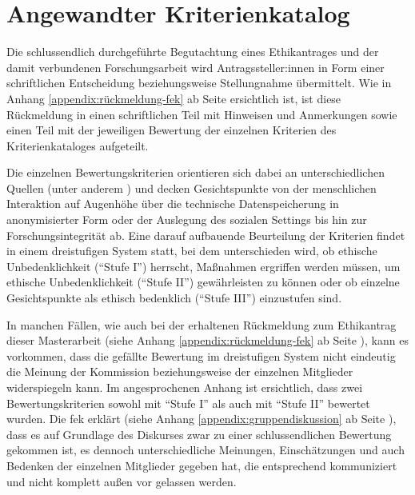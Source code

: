 \documentclass[a4paper,12pt,twoside]{scrreprt}
\begin{document}
\section{Angewandter Kriterienkatalog}
\label{sec:angewandter-kriterienkatalog}

Die schlussendlich durchgeführte Begutachtung eines Ethikantrages und der damit verbundenen Forschungsarbeit wird Antragssteller:innen in Form einer schriftlichen Entscheidung beziehungsweise Stellungnahme übermittelt. \cite[4]{forschungsethik-kommission_der_fachhochschule_vorarlberg_verfahrensordnung_2020} Wie in Anhang \ref{appendix:rückmeldung-fek} ab Seite \pageref{appendix:rückmeldung-fek} ersichtlich ist, ist diese Rückmeldung in einen schriftlichen Teil mit Hinweisen und Anmerkungen sowie einen Teil mit der jeweiligen Bewertung der einzelnen Kriterien des Kriterienkataloges aufgeteilt.

Die einzelnen Bewertungskriterien orientieren sich dabei an unterschiedlichen Quellen (unter anderem \cite{manzeschke_meestar_2015, marckmann_was_2000, schuchter_care_2018}) und decken Gesichtspunkte von der menschlichen Interaktion auf Augenhöhe über die technische Datenspeicherung in anonymisierter Form oder der Auslegung des sozialen Settings bis hin zur Forschungsintegrität ab. Eine darauf aufbauende Beurteilung der Kriterien findet in einem dreistufigen System statt, bei dem unterschieden wird, ob ethische Unbedenklichkeit (\enquote{Stufe I}) herrscht, Maßnahmen ergriffen werden müssen, um ethische Unbedenklichkeit (\enquote{Stufe II}) gewährleisten zu können oder ob einzelne Gesichtspunkte als ethisch bedenklich (\enquote{Stufe III}) einzustufen sind. \cite[1]{forschungsethik-kommission_der_fachhochschule_vorarlberg_kriterienkatalog_2021}

\medskip

In manchen Fällen, wie auch bei der erhaltenen Rückmeldung zum Ethikantrag dieser Masterarbeit (siehe Anhang \ref{appendix:rückmeldung-fek} ab Seite \pageref{appendix:rückmeldung-fek}), kann es vorkommen, dass die gefällte Bewertung im dreistufigen System nicht eindeutig die Meinung der Kommission beziehungsweise der einzelnen Mitglieder widerspiegeln kann. Im angesprochenen Anhang ist ersichtlich, dass zwei Bewertungskriterien sowohl mit \enquote{Stufe I} als auch mit \enquote{Stufe II} bewertet wurden. Die \ac{fek} erklärt (siehe Anhang \ref{appendix:gruppendiskussion} ab Seite \pageref{appendix:gruppendiskussion}), dass es auf Grundlage des Diskurses zwar zu einer schlussendlichen Bewertung gekommen ist, es dennoch unterschiedliche Meinungen, Einschätzungen und auch Bedenken der einzelnen Mitglieder gegeben hat, die entsprechend kommuniziert und nicht komplett außen vor gelassen werden.
\end{document}
